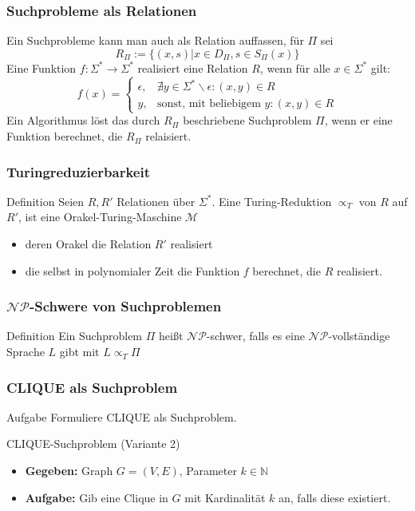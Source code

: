 \documentclass{beamer}
\begin{document}
{\begin{frame}
\frametitle{Suchprobleme als Relationen}
Ein Suchprobleme kann man auch als Relation auffassen, für $\Pi$ sei
$$ R_\Pi := \{ (x,s) | x \in D_\Pi, s\in S_\Pi(x)\}$$
Eine Funktion $f: \Sigma^* \rightarrow \Sigma^*$ realisiert eine Relation $R$, wenn für alle $x \in \Sigma^*$ gilt:
$$f(x) = \begin{cases}
\epsilon, & \nexists y \in \Sigma^*\backslash\epsilon : (x,y) \in R\\
y, & \mbox{sonst, mit beliebigem }y:(x,y) \in R
\end{cases}$$
Ein Algorithmus löst das durch $R_\Pi$ beschriebene Suchproblem $\Pi$, wenn er eine Funktion berechnet, die $R_\Pi$ relaisiert.
\end{frame}

\begin{frame}
\frametitle{Turingreduzierbarkeit}
\begin{block}{Definition}
Seien $R, R'$ Relationen über $\Sigma^*$. Eine Turing-Reduktion $\propto_T$ von $R$ auf $R'$, ist eine Orakel-Turing-Maschine $\mathcal{M}$
\begin{itemize}
\item deren Orakel die Relation $R'$ realisiert
\item die selbst in polynomialer Zeit die Funktion $f$ berechnet, die $R$ realisiert. 
\end{itemize}
\end{block}
\end{frame}

\begin{frame}
 \frametitle{$\mathcal{NP}$-Schwere von Suchproblemen}
 \begin{block}{Definition}
  Ein Suchproblem $\Pi$ heißt $\mathcal{NP}$-schwer, falls es eine $\mathcal{NP}$-vollständige Sprache $L$ gibt mit $L \propto_T \Pi$
 \end{block}
\end{frame}

\begin{frame}
 \frametitle{CLIQUE als Suchproblem}
 \begin{block}{Aufgabe}
  Formuliere CLIQUE als Suchproblem.
 \end{block}
 \pause
 \begin{block}{CLIQUE-Suchproblem (Variante 2)}
  \begin{itemize}
   \item \textbf{Gegeben: } Graph $G = (V,E)$, Parameter $k\in \mathbb{N}$
   \item \textbf{Aufgabe: } Gib eine Clique in $G$ mit Kardinalität $k$ an, falls diese existiert.
  \end{itemize}
 \end{block}
 \end{frame}
 
}
\end{document}
